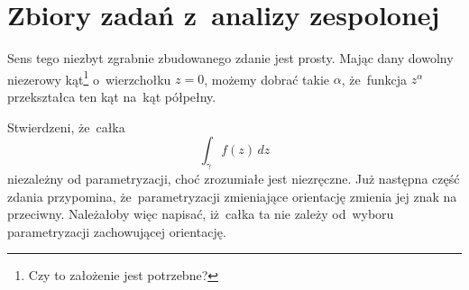 \documentclass[a4paper,11pt]{article}
\begin{document}
\vspace{\spaceTwo}










\newpage
\section{Zbiory zadań z~analizy zespolonej}

\vspace{\spaceTwo}







\start {} Sens tego niezbyt zgrabnie zbudowanego zdanie
jest prosty. Mając dany dowolny niezerowy kąt\footnote{Czy to
  założenie jest potrzebne?} o~wierzchołku $z = 0$, możemy dobrać
takie $\alpha$, że~funkcja $z^{ \alpha }$ przekształca ten kąt na~kąt półpełny.

\vspace{\spaceFour}



\start {} Stwierdzeni, że~całka
\begin{equation}
  \label{eq:KrzyzZZzFA-01}
  \int_{ \gamma } f( z ) \, dz
\end{equation}
niezależny od parametryzacji, choć zrozumiałe jest niezręczne. Już
następna część zdania przypomina, że~parametryzacji zmieniające
orientację zmienia jej znak na przeciwny. Należałoby więc napisać,
iż~całka ta nie zależy od~wyboru parametryzacji zachowującej
orientację.

\vspace{\spaceFour}









\end{document}

